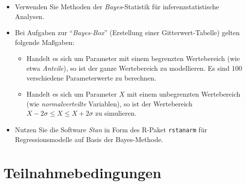 \documentclass[
  a4paper,
  DIV=11]{scrreprt}
\providecommand{\tightlist}{%
  \setlength{\itemsep}{0pt}\setlength{\parskip}{0pt}}\usepackage{longtable,booktabs,array}
\theoremstyle{definition}
\theoremstyle{remark}
\begin{document}
\begin{itemize}
\tightlist
\item
  Verwenden Sie Methoden der \emph{Bayes}-Statistik für
  inferenzstatistische Analysen.
\item
  Bei Aufgaben zur ``\emph{Bayes-Box}'' (Erstellung einer
  Gitterwert-Tabelle) gelten folgende Maßgaben:

  \begin{itemize}
  \tightlist
  \item
    Handelt es sich um Parameter mit einem begrenzten Wertebereich (wie
    etwa \emph{Anteile}), so ist der ganze Wertebereich zu modellieren.
    Es sind 100 verschiedene Parameterwerte zu berechnen.
  \item
    Handelt es sich um Parameter \(X\) mit einem unbegrenzten
    Wertebereich (wie \emph{normalverteilte} Variablen), so ist der
    Wertebereich \(X-2\sigma \le X \le X+2\sigma\) zu simulieren.
  \end{itemize}
\item
  Nutzen Sie die Software \emph{Stan} in Form des R-Paket
  \texttt{rstanarm} für Regressionsmodelle auf Basis der Bayes-Methode.
\end{itemize}

\hypertarget{teilnahmebedingungen}{%
\section{Teilnahmebedingungen}\label{teilnahmebedingungen}}
\end{document}
